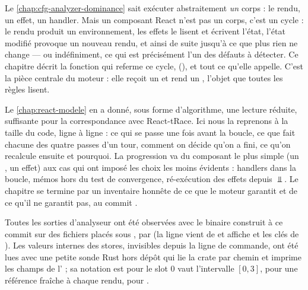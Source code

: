 
Le \cref{chap:cfg-analyzer-dominance} sait exécuter abstraitement \emph{un}
corps : le rendu, un effet, un handler. Mais un composant React n'est pas un
corps, c'est un cycle : le rendu produit un environnement, les effets le lisent
et écrivent l'état, l'état modifié provoque un nouveau rendu, et ainsi de suite
jusqu'à ce que plus rien ne change --- ou indéfiniment, ce qui est précisément
l'un des défauts à détecter. Ce chapitre décrit la fonction qui referme ce
cycle,  (),
et tout ce qu'elle appelle. C'est la pièce centrale du moteur : elle reçoit un
 et rend un , l'objet que toutes les
règles lisent.

Le \cref{chap:react-modele} en a donné, sous forme d'algorithme, une
lecture réduite, suffisante pour la correspondance avec React-tRace. Ici nous
la reprenons à la taille du code, ligne à ligne : ce qui se passe une fois
avant la boucle, ce que fait chacune des quatre passes d'un tour, comment on
décide qu'on a fini, ce qu'on recalcule ensuite et pourquoi. La progression va
du composant le plus simple (un , un effet) aux cas qui ont
imposé les choix les moins évidents : handlers dans la boucle, mémos hors
du test de convergence, ré-exécution des effets depuis $\Bot$. Le chapitre
se termine par un inventaire honnête de ce que le moteur garantit et de ce
qu'il ne garantit pas, au commit \snapshotCommit.

Toutes les sorties d'analyseur ont été observées avec le binaire construit à
ce commit sur des fichiers placés sous , par
(la ligne  vient de
 et affiche  et les clés de
). Les valeurs internes des stores, invisibles depuis la
ligne de commande, ont été lues avec une petite sonde Rust hors dépôt qui lie
la crate  par chemin et imprime les champs de
l' ; sa notation est  pour \og le slot
0 vaut l'intervalle $[0,3]$\fg{},  pour une référence
fraîche à chaque rendu,  pour .

